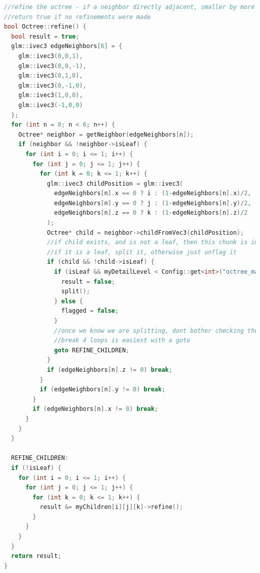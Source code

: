 \documentclass[11pt]{article}
\begin{document}
\begin{enumerate}
  \begin{lstlisting}[language=C++,label={refinephase},caption={The second stage in the octree refinement process, \texttt{refine}. The array \texttt{edgeNeighbors} corresponds to the relative positions of the 6 neighboring nodes at the same level, and the variable \texttt{childPosition} gives the position of the child to check in each neighbor. The flow of this code is designed such that exactly the 4 children of the neighboring node that touch the chunk in this node are checked.}] 
//refine the octree - if a neighbor directly adjacent, smaller by more than one exists, split this
//return true if no refinements were made
bool Octree::refine() {
  bool result = true;
  glm::ivec3 edgeNeighbors[6] = {
    glm::ivec3(0,0,1),
    glm::ivec3(0,0,-1),
    glm::ivec3(0,1,0),
    glm::ivec3(0,-1,0),
    glm::ivec3(1,0,0),
    glm::ivec3(-1,0,0)
  };
  for (int n = 0; n < 6; n++) {
    Octree* neighbor = getNeighbor(edgeNeighbors[n]);
    if (neighbor && !neighbor->isLeaf) {
      for (int i = 0; i <= 1; i++) {
        for (int j = 0; j <= 1; j++) {
          for (int k = 0; k <= 1; k++) {
            glm::ivec3 childPosition = glm::ivec3(
              edgeNeighbors[n].x == 0 ? i : (1-edgeNeighbors[n].x)/2,
              edgeNeighbors[n].y == 0 ? j : (1-edgeNeighbors[n].y)/2,
              edgeNeighbors[n].z == 0 ? k : (1-edgeNeighbors[n].z)/2
            );
            Octree* child = neighbor->childFromVec3(childPosition);
            //if child exists, and is not a leaf, then this chunk is inconsistent
            //if it is a leaf, split it, otherwise just unflag it
            if (child && !child->isLeaf) {
              if (isLeaf && myDetailLevel < Config::get<int>("octree_max_depth")) {
                result = false;
                split();
              } else {
                flagged = false;
              }
              //once we know we are splitting, dont bother checking the other options
              //break 4 loops is easiest with a goto
              goto REFINE_CHILDREN;
            }
            if (edgeNeighbors[n].z != 0) break;
          }
          if (edgeNeighbors[n].y != 0) break;
        }
        if (edgeNeighbors[n].x != 0) break;
      }
    }
  }
  
  REFINE_CHILDREN:
  if (!isLeaf) {
    for (int i = 0; i <= 1; i++) {
      for (int j = 0; j <= 1; j++) {
        for (int k = 0; k <= 1; k++) {
          result &= myChildren[i][j][k]->refine();
        }
      }
    }
  }
  return result;
}
  \end{lstlisting}


\end{enumerate}
\end{document}
